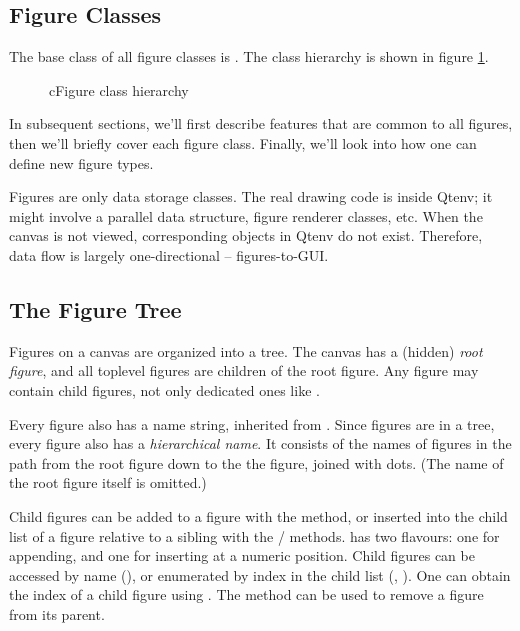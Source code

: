 \subsection{Figure Classes}
\label{sec:graphics:figure-classes}

The base class of all figure classes is . The class hierarchy
is shown in figure \ref{fig:figure-inheritance}.

\begin{figure}[htbp]
  \begin{center}
    
    \caption{cFigure class hierarchy}
    \label{fig:figure-inheritance}
  \end{center}
\end{figure}

In subsequent sections, we'll first describe features that are common
to all figures, then we'll briefly cover each figure class. Finally,
we'll look into how one can define new figure types.

\begin{note}
Figures are only data storage classes. The real drawing code is inside
Qtenv; it might involve a parallel data structure, figure renderer
classes, etc. When the canvas is not viewed, corresponding objects in
Qtenv do not exist. Therefore, data flow is largely one-directional --
figures-to-GUI.
\end{note}


\subsection{The Figure Tree}
\label{sec:graphics:figure-tree}

Figures on a canvas are organized into a tree. The canvas has a
(hidden) \textit{root figure}, and all toplevel figures are
children of the root figure. Any figure may contain child figures,
not only dedicated ones like .

Every figure also has a name string, inherited from .
Since figures are in a tree, every figure also has a \textit{hierarchical name}.
It consists of the names of figures in the path from the root figure down to the
the figure, joined with dots. (The name of the root figure itself is omitted.)

Child figures can be added to a figure with the  method, or
inserted into the child list of a figure relative to a sibling with the
 /  methods.
 has two flavours: one for appending, and one for inserting
at a numeric position. Child figures can be accessed by name
(), or enumerated by index in the child list
(, ). One can obtain the index of a
child figure using  . The  method
can be used to remove a figure from its parent.

